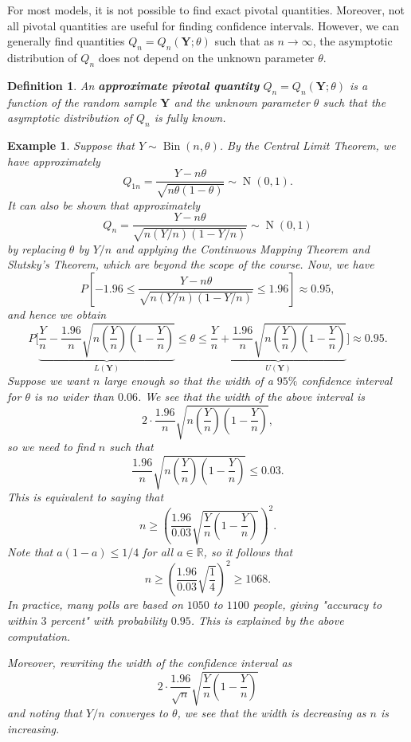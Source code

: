 \documentclass[10pt]{article}
\newcommand{\R}{\mathbb{R}}
\DeclareMathOperator{\Bin}{Bin}
\DeclareMathOperator{\Nor}{N}
\theoremstyle{newstyle}
\newtheorem{defn}[thm]{Definition}
\newtheorem{exmp}[thm]{Example}
\begin{document}
For most models, it is not possible to find exact pivotal quantities. Moreover, not 
all pivotal quantities are useful for finding confidence intervals. However, 
we can generally find quantities $Q_n = Q_n(\mathbf Y; \theta)$ such that as 
$n \to \infty$, the asymptotic distribution of $Q_n$ does not depend on the unknown 
parameter $\theta$. 

\begin{defn}
An {\bf approximate pivotal quantity} $Q_n = Q_n(\mathbf Y; \theta)$ is a function of the 
random sample $\mathbf Y$ and the unknown parameter $\theta$ such that the asymptotic 
distribution of $Q_n$ is fully known. 
\end{defn}

\begin{exmp}
Suppose that $Y \sim \Bin(n, \theta)$. By the Central Limit Theorem, we have approximately 
\[ Q_{1n} = \frac{Y - n\theta}{\sqrt{n\theta(1-\theta)}} \sim \Nor(0, 1). \]
It can also be shown that approximately 
\[ Q_n = \frac{Y - n\theta}{\sqrt{n(Y/n)(1-Y/n)}} \sim \Nor(0, 1) \]
by replacing $\theta$ by $Y/n$ and applying the Continuous Mapping Theorem and 
Slutsky's Theorem, which are beyond the scope of the course. Now, we have 
\[ P \left[ -1.96 \leq \frac{Y - n\theta}{\sqrt{n(Y/n)(1-Y/n)}} \leq 1.96 \right] \approx 0.95, \]
and hence we obtain 
\[ P \Bigg[ 
\underbrace{\frac Yn - \frac{1.96}n \sqrt{n \left( \frac Yn \right) \left( 1 - \frac Yn \right)}}_{L(\mathbf Y)}
\leq \theta \leq 
\underbrace{\frac Yn + \frac{1.96}n \sqrt{n \left( \frac Yn \right) \left( 1 - \frac Yn \right)}}_{U(\mathbf Y)}
\Bigg] \approx 0.95. \]
Suppose we want $n$ large enough so that the width of a $95\%$ confidence interval for 
$\theta$ is no wider than $0.06$. We see that the width of the above interval is 
\[ 2 \cdot \frac{1.96}n \sqrt{n \left( \frac Yn \right) \left( 1 - \frac Yn \right)}, \]
so we need to find $n$ such that 
\[ \frac{1.96}n \sqrt{n \left( \frac Yn \right) \left( 1 - \frac Yn \right)} \leq 0.03. \]
This is equivalent to saying that 
\[ n \geq \left( \frac{1.96}{0.03} \sqrt{\frac Yn \left( 1 - \frac Yn \right)} \right)^2. \]
Note that $a(1-a) \leq 1/4$ for all $a \in \R$, so it follows that 
\[ n \geq \left( \frac{1.96}{0.03} \sqrt{\frac14} \right)^2 \geq 1068. \]
In practice, many polls are based on $1050$ to $1100$ people, giving "accuracy to within 
$3$ percent" with probability $0.95$. This is explained by the above computation. 

Moreover, rewriting the width of the confidence interval as 
\[ 2 \cdot \frac{1.96}{\sqrt n} \sqrt{\frac Yn \left( 1 - \frac Yn \right)} \]
and noting that $Y/n$ converges to $\theta$, we see that the width is decreasing as $n$ is increasing.
\end{exmp}
\end{document}
